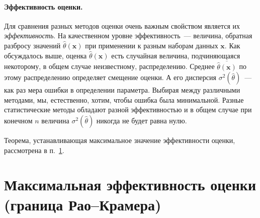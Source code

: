 

\paragraph{Эффективность оценки.}
Для сравнения разных методов оценки очень важным свойством является
их \emph{эффективность}. На качественном уровне эффективность~--- величина,
обратная разбросу значений $\hat{\theta}(\mathbf{x})$ при применении к разным
наборам данных $\mathbf{x}$. Как обсуждалось выше, оценка $\hat{\theta}(\mathbf{x})$
есть случайная величина, подчиняющаяся некоторому, в общем случае неизвестному,
распределению. Среднее $\overline{\hat{\theta}(\mathbf{x})}$ по этому распределению
определяет смещение оценки.
А его дисперсия $\sigma^2\left(\hat\theta\right)$~--- как раз мера ошибки
в определении параметра. Выбирая между различными методами, мы, естественно,
хотим, чтобы ошибка была минимальной. Разные статистические методы обладают
разной эффективностью и в общем случае при конечном $n$ величина
$\sigma^2\left(\hat\theta\right)$ никогда не будет равна нулю.

Теорема, устанавливающая максимальное значение эффективности оценки,
рассмотрена в п.~\ref{sec:rao}.


\section{Максимальная эффективность оценки (граница Рао--Крамера)}\label{sec:rao}


